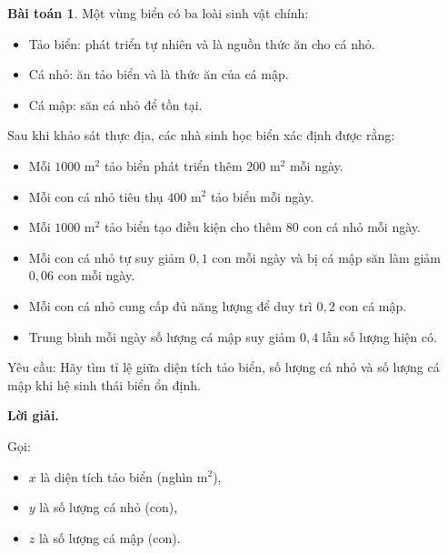 \documentclass[12pt,a4paper,oneside]{book}
\theoremstyle{theorem}
\theoremstyle{definition}
\newtheorem{bt}[theorem2]{Bài toán}
\begin{document}
\begin{bt}
Một vùng biển có ba loài sinh vật chính:

\begin{itemize}
    \item Tảo biển: phát triển tự nhiên và là nguồn thức ăn cho cá nhỏ.
    
    \item Cá nhỏ: ăn tảo biển và là thức ăn của cá mập.
    
    \item Cá mập: săn cá nhỏ để tồn tại.
\end{itemize}

Sau khi khảo sát thực địa, các nhà sinh học biển xác định được rằng:

\begin{itemize}
    \item Mỗi \(1000\text{ m}^2\) tảo biển phát triển thêm \(200\text{ m}^2\) mỗi ngày.
    
    \item Mỗi con cá nhỏ tiêu thụ \(400\text{ m}^2\) tảo biển mỗi ngày.
    
    \item Mỗi \(1000\text{ m}^2\) tảo biển tạo điều kiện cho thêm \(80\) con cá nhỏ mỗi ngày.
    
    \item Mỗi con cá nhỏ tự suy giảm \(0,1\) con mỗi ngày và bị cá mập săn làm giảm \(0,06\) con mỗi ngày.
    
    \item Mỗi con cá nhỏ cung cấp đủ năng lượng để duy trì \(0,2\) con cá mập.
    
    \item Trung bình mỗi ngày số lượng cá mập suy giảm \(0,4\) lần số lượng hiện có.
\end{itemize}

Yêu cầu: Hãy tìm tỉ lệ giữa diện tích tảo biển, số lượng cá nhỏ và số lượng
cá mập khi hệ sinh thái biển ổn định.

\bigskip

\textbf{Lời giải.}

Gọi:

\begin{itemize}
    \item \(x\) là diện tích tảo biển (nghìn m\(^2\)),
    
    \item \(y\) là số lượng cá nhỏ (con),
    
    \item \(z\) là số lượng cá mập (con).
\end{itemize}


\end{bt}
\end{document}
